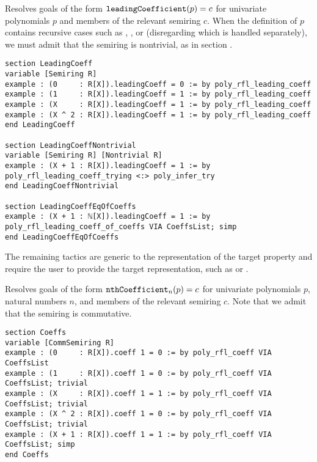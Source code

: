 \begin{tactic}
\label{tac:poly_rfl_leading_coeff}
\leanok
{}
Resolves goals of the form $\mathtt{leadingCoefficient}(p) = c$ for univariate polynomials $p$ and members of the relevant semiring $c$. When the definition of $p$ contains recursive cases such as \leaninline{+}, \leaninline{*}, or \leaninline{\^{}} (disregarding  which is handled separately), we must admit that the semiring is nontrivial, as in section .
\begin{lstlisting}
section LeadingCoeff
variable [Semiring R]
example : (0     : R[X]).leadingCoeff = 0 := by poly_rfl_leading_coeff
example : (1     : R[X]).leadingCoeff = 1 := by poly_rfl_leading_coeff
example : (X     : R[X]).leadingCoeff = 1 := by poly_rfl_leading_coeff
example : (X ^ 2 : R[X]).leadingCoeff = 1 := by poly_rfl_leading_coeff
end LeadingCoeff

section LeadingCoeffNontrivial
variable [Semiring R] [Nontrivial R]
example : (X + 1 : R[X]).leadingCoeff = 1 := by poly_rfl_leading_coeff_trying <:> poly_infer_try
end LeadingCoeffNontrivial

section LeadingCoeffEqOfCoeffs
example : (X + 1 : ℕ[X]).leadingCoeff = 1 := by poly_rfl_leading_coeff_of_coeffs VIA CoeffsList; simp
end LeadingCoeffEqOfCoeffs
\end{lstlisting}
\end{tactic}

The remaining tactics are generic to the representation of the target property and require the user to provide the target representation, such as  or .

\begin{tactic}
\label{tac:poly_rfl_coeff}
\leanok
{}
Resolves goals of the form $\mathtt{nthCoefficient}_n(p) = c$ for univariate polynomials $p$, natural numbers $n$, and members of the relevant semiring $c$. Note that we admit that the semiring is commutative.
\begin{lstlisting}
section Coeffs
variable [CommSemiring R]
example : (0     : R[X]).coeff 1 = 0 := by poly_rfl_coeff VIA CoeffsList
example : (1     : R[X]).coeff 1 = 0 := by poly_rfl_coeff VIA CoeffsList; trivial
example : (X     : R[X]).coeff 1 = 1 := by poly_rfl_coeff VIA CoeffsList; trivial
example : (X ^ 2 : R[X]).coeff 1 = 0 := by poly_rfl_coeff VIA CoeffsList; trivial
example : (X + 1 : R[X]).coeff 1 = 1 := by poly_rfl_coeff VIA CoeffsList; simp
end Coeffs
\end{lstlisting}
\end{tactic}

